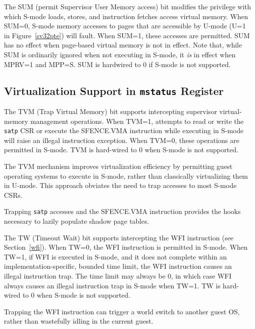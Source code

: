 The SUM (permit Supervisor User Memory access) bit modifies the privilege with
which S-mode loads, stores, and instruction fetches access virtual memory.
When SUM=0, S-mode memory accesses to pages that are accessible by U-mode (U=1
in Figure~\ref{sv32pte}) will fault.  When SUM=1, these accesses are
permitted.  SUM has no effect when page-based virtual memory is not in effect.
Note that, while SUM is ordinarily ignored when not executing in S-mode, it
{\em is} in effect when MPRV=1 and MPP=S.  SUM is hardwired to 0 if S-mode is
not supported.

\subsection{Virtualization Support in {\tt mstatus} Register}

The TVM (Trap Virtual Memory) bit supports intercepting
supervisor virtual-memory management operations.  When TVM=1,
attempts to read or write the {\tt satp} CSR or execute the SFENCE.VMA
instruction while executing in S-mode will raise an illegal instruction
exception.  When TVM=0, these operations are permitted in S-mode.
TVM is hard-wired to 0 when S-mode is not supported.

\begin{commentary}
The TVM mechanism improves virtualization efficiency by permitting guest
operating systems to execute in S-mode, rather than classically virtualizing
them in U-mode.  This approach obviates the need to trap accesses to most
S-mode CSRs.

Trapping {\tt satp} accesses and the SFENCE.VMA instruction provides the
hooks necessary to lazily populate shadow page tables.
\end{commentary}

The TW (Timeout Wait) bit supports intercepting the WFI instruction (see
Section~\ref{wfi}).  When TW=0, the WFI instruction is permitted in S-mode.
When TW=1, if WFI is executed in S-mode, and it does not complete within an
implementation-specific, bounded time limit, the WFI instruction causes an
illegal instruction trap.  The time limit may always be 0, in which case WFI
always causes an illegal instruction trap in S-mode when TW=1.
TW is hard-wired to 0 when S-mode is not supported.

\begin{commentary}
Trapping the WFI
instruction can trigger a world switch to another guest OS, rather than
wastefully idling in the current guest.
\end{commentary}

